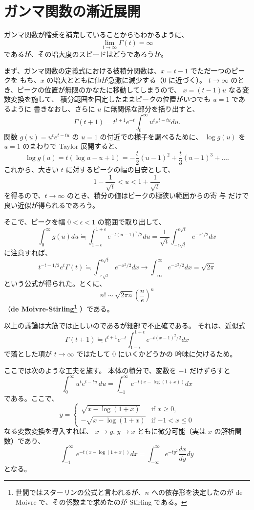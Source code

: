 \documentclass[a4paper]{jsarticle}
\theoremstyle{definition}
\theoremstyle{remark}
\begin{document}


\section{ガンマ関数の漸近展開}\label{gamma}
ガンマ関数が階乗を補完していることからもわかるように、
\[
\lim_{t \to \infty} \Gamma(t) = \infty
\]
であるが、その増大度のスピードはどうであろうか。

まず、ガンマ関数の定義式における被積分関数は、$x = t-1$ でただ一つのピー
クを
もち、$x$ の増大とともに値が急激に減少する（$0$ に近づく）。
$t \to \infty$ のとき、ピークの位置が無限のかなたに移動してしまうので、
$x = (t-1)u$ なる変数変換を施して、
積分範囲を固定したままピークの位置がいつでも $u = 1$ であるように
書きなおし、さらに $u$ に無関係な部分を括り出すと、
\[
\Gamma(t+1) = t^{t+1} e^{-t} \int_0^{\infty} u^t e^{t-tu} du.
\]
関数 $g(u) = u^te^{t-tu}$ の $u=1$ の付近での様子を調べるために、
$\log g(u)$ を $u = 1$ のまわりで Taylor 展開すると、
\[
\log g(u) = t(\log u - u + 1)
= -\frac{t}{2}(u-1)^2 + \frac{t}{3}(u-1)^3 + \dots.
\]
これから、大きい $t$ に対するピークの幅の目安として、
\[
1 - \frac{1}{\sqrt{t}} < u < 1 + \frac{1}{\sqrt{t}}
\]
を得るので、$t \to \infty$ のとき、積分の値はピークの極狭い範囲からの寄
与
だけで良い近似が得られるであろう。

そこで、ピークを幅 $0 < \epsilon < 1$ の範囲で取り出して、
\[
\int_0^{\infty} g(u) du
\fallingdotseq
\int_{1-\epsilon}^{1+\epsilon} e^{-t(u-1)^2/2} du
= \frac{1}{\sqrt{t}} \int_{-\epsilon\sqrt{t}}^{\epsilon\sqrt{t}}
e^{-x^2/2} dx
\]
に注意すれば、
\[
t^{-t-1/2} e^t \Gamma(t)
\fallingdotseq
\int_{-\epsilon\sqrt{t}}^{\epsilon\sqrt{t}} e^{-x^2/2} dx
\to
\int_{-\infty}^{\infty}e^{-x^2/2} dx
= \sqrt{2\pi}
\]
という公式が得られた。とくに、
\[
n! \sim \sqrt{2\pi n} \left( \frac{n}{e} \right)^n
\]
（{\bf de Moivre-Stirling\footnote{世間ではスターリンの公式と言われるが、$n$ への依存形を決定したのが de Moivre で、その係数まで求めたのが Stirling である。}}
  ）である。

以上の議論は大筋では正しいのであるが細部で不正確である。
それは、近似式
\[
\Gamma(t+1) \fallingdotseq t^{t+1} e^{-t}
\int_{1-\epsilon}^{1+\epsilon} e^{-t(x-1)^2/2} dx
\]
で落とした項が $t \to \infty$ ではたして $0$ にいくかどうかの
吟味に欠けるため。

ここでは次のような工夫を施す。
本体の積分で、変数を $-1$ だけずらすと
\[
\int_0^{\infty} u^te^{t-tu}\,du =
\int_{-1}^{\infty} e^{-t(x - \log(1+x))} dx
\]
である。ここで、
\[
y =
\begin{cases}
\sqrt{x - \log(1+x)} &\text{if $x \geq 0$,}\\
-\sqrt{x - \log(1+x)} &\text{if $-1 < x \leq 0$}
\end{cases}
\]
なる変数変換を導入すれば、
$x \to y$, $y \to x$ ともに微分可能（実は $x$ の解析関数）であり、
\[
\int_{-1}^{\infty} e^{-t(x - \log(1+x))} dx
= \int_{-\infty}^{\infty} e^{-ty^2} \frac{dx}{dy} dy
\]
となる。
\end{document}
